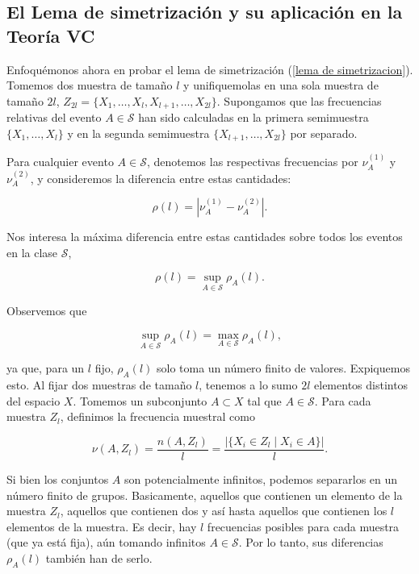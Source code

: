 \documentclass{article}
\begin{document}
\bigskip

\subsection{El Lema de simetrización y su aplicación en la Teoría VC}

Enfoquémonos ahora en probar el lema de simetrización (\ref{lema de simetrizacion}). Tomemos dos muestra de tamaño $l$ y
unifiquemolas en una sola muestra de tamaño \( 2l \),
\( Z_{2l} = \{ X_1, \dots, X_l, X_{l+1}, \dots, X_{2l} \} \). Supongamos que las frecuencias relativas del evento \( A \in \mathcal{S} \) 
han sido calculadas en la primera semimuestra \( \{ X_1, \dots, X_l \} \) y en la segunda semimuestra \( \{ X_{l+1}, \dots, X_{2l} \} \)
por separado.\newline

Para cualquier evento $A\in\mathcal{S}$, denotemos las respectivas frecuencias por \( \nu_A^{(1)}\) y \( \nu_A^{(2)} \), 
y consideremos la diferencia entre estas cantidades:

\[
\rho(l) = |\nu_A^{(1)} - \nu_A^{(2)}|.
\]

Nos interesa la máxima diferencia entre estas cantidades sobre todos los eventos en la clase \( \mathcal{S} \),

\[
\rho(l) = \sup_{A \in \mathcal{S}} \rho_A(l).
\]

Observemos que 

\[
\sup_{A \in \mathcal{S}} \rho_A(l) = \max_{A \in \mathcal{S}} \rho_A(l),
\]

ya que, para un \( l \) fijo, \( \rho_A(l) \) solo toma un número finito de valores. Expiquemos esto.
Al fijar dos muestras de tamaño $l$, tenemos a lo sumo $2l$ elementos distintos del espacio $X$. Tomemos un
subconjunto $A\subset X$ tal que $A\in\mathcal{S}$. Para cada muestra $Z_l$, definimos la frecuencia muestral
como 

\[
\nu(A,Z_l) = \frac{n(A,Z_l)}{l} = \frac{|\{ X_i \in Z_l \mid X_i \in A \}|}{l}.
\]

Si bien los conjuntos $A$ son potencialmente infinitos, podemos separarlos en un número finito de grupos. Basicamente,
aquellos que contienen un elemento de la muestra $Z_l$, aquellos que contienen dos y así hasta aquellos que contienen
los $l$ elementos de la muestra. Es decir, hay $l$ frecuencias posibles para cada muestra (que ya está fija), aún
tomando infinitos $A\in\mathcal{S}$. Por lo tanto, sus diferencias $\rho_A(l)$ también han de serlo.\newline
\end{document}
